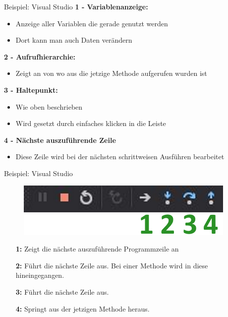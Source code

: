 \begin{frame}{Beispiel: Visual Studio}
	\textbf{1 - Variablenanzeige:}
	\begin{itemize}
		\item Anzeige aller Variablen die gerade genutzt werden
		\item Dort kann man auch Daten verändern
	\end{itemize}
	\textbf{2 - Aufrufhierarchie:}
	\begin{itemize}
		\item Zeigt an von wo aus die jetzige Methode aufgerufen wurden ist
	\end{itemize}
	\textbf{3 - Haltepunkt:}
	\begin{itemize}
		\item Wie oben beschrieben
		\item Wird gesetzt durch einfaches klicken in die Leiste
	\end{itemize}
	\textbf{4 - Nächste auszuführende Zeile}
	\begin{itemize}
		\item Diese Zeile wird bei der nächsten schrittweisen Ausführen bearbeitet
	\end{itemize}
\end{frame}

\begin{frame}{Beispiel: Visual Studio}
	\begin{figure}
		\includegraphics{resources/02_grundlagen_2/debugging.png}
	\end{figure}
	\begin{enumerate}
		\item[\textbf{1: }] Zeigt die nächste auszuführende Programmzeile an
		\item[\textbf{2: }] Führt die nächste Zeile aus. Bei einer Methode wird in diese hineingegangen.
		\item[\textbf{3: }] Führt die nächste Zeile aus.
		\item[\textbf{4: }] Springt aus der jetzigen Methode heraus.
	\end{enumerate}
\end{frame}



